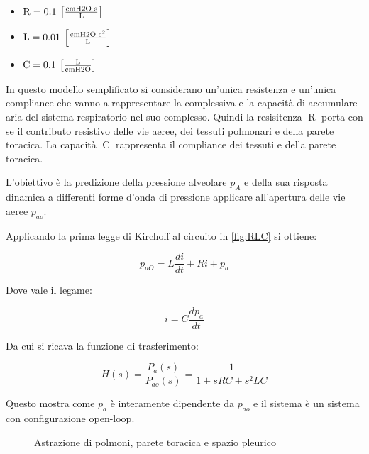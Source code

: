 \begin{itemize}
	\item $\operatorname{R}=0.1  \:\left[\text{cmH2O s}\over \text{L} \right]$
	\item $\operatorname{L}=0.01 \:\left[\text{cmH2O s}^2\over \text{L} \right]$
	\item $\operatorname{C}=0.1 \:\left[\text{L}\over \text{cmH2O} \right]$
\end{itemize}

In questo modello semplificato si considerano un'unica resistenza e un'unica compliance che vanno a rappresentare la complessiva e la capacità di accumulare aria del sistema respiratorio nel suo complesso. Quindi la resisitenza $\operatorname{R}$ porta con se il contributo resistivo delle vie aeree, dei tessuti polmonari e della parete toracica. La capacità $\operatorname{C}$ rappresenta il compliance dei tessuti e della parete toracica.

L'obiettivo è la predizione della pressione alveolare $p_A$ e della sua risposta dinamica a differenti forme d'onda di pressione applicare all'apertura delle vie aeree $p_{ao}$.

Applicando la prima legge di Kirchoff al circuito in \cref{fig:RLC} si ottiene:

\begin{equation}
p_{a O}=L \frac{d i}{d t}+R i+p_{a}
\end{equation}

Dove vale il legame:

\begin{equation}
	i=C \frac{d p_{a}}{d t}
\end{equation}

Da cui si ricava la funzione di trasferimento:

\begin{equation}
	H(s)=\frac{P_{a}(s)}{P_{ao}(s)}=\frac{1}{1+s R C+s^{2} L C}
\end{equation}

Questo mostra come $p_a$ è interamente dipendente da $p_{ao}$ e il sistema è un sistema con configurazione open-loop. 

\begin{figure}[b!]
	\centering
	\small{
	\def\svgwidth{0.8\linewidth}
	}
	\caption{Astrazione di polmoni, parete toracica e spazio pleurico}
	\label{fig:model}
\end{figure}

\begin{figure*}[t]
	\begin{subfigure}{0.5\linewidth}
		\centering
		 	\small{\def\svgwidth{0.85\linewidth}
	}
	\caption{}
	\end{subfigure}\hfill
	\begin{subfigure}{0.5\linewidth}
		\centering
	\def\svgwidth{0.8\linewidth}
	
	\caption{}
\end{subfigure}
\caption{Circuito RLC rappresentante la meccanica polmonare (a); sistema open loop rappresentante il circuito RLC (b)}
\label{fig:RLC}
\end{figure*}

